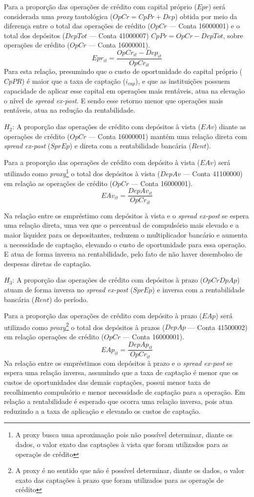 \documentclass[12pt,12pt,openright,oneside,a4paper,chapter=TITLE,section=TITLE,subsection=TITLE,subsubsection=TITLE english,french,spanish,portugues,sumario=tradicional]{abntex2}
\begin{document}
Para a proporção das operações de crédito com capital próprio (\(Epr\)) será considerada uma \emph{proxy} tautológica (\(OpCr = CpPr + Dep\)) obtida por meio da diferença entre o total das operações de crédito (\(OpCr\) --- Conta 16000001) e o total dos depósitos (\(DepTot\) --- Conta 41000007) \(CpPr = OpCr - DepTot\), sobre operações de crédito (\(OpCr\) --- Conta 16000001).
\[
Epr_{it} = \frac{OpCr_{it} - Dep_{it}}{OpCr_{it}}
\]
Para esta relação, presumindo que o custo de oportunidade do capital próprio (\(CpPR\)) é maior que a taxa de captação (\(i_{cap}\)), e que as instituições possuem capacidade de aplicar esse capital em operações mais rentáveis, atua na elevação o nível de \emph{spread ex-post}. E sendo esse retorno menor que operações mais rentáveis, atua na redução da rentabilidade.

\(H_2\): A proporção das operações de crédito com depósitos à vista (\(EAv\)) diante as operações de crédito (\(OpCr\) --- Conta 16000001) mantém uma relação direta com \emph{spread ex-post} (\(SprEp\)) e direta com a rentabilidade bancária (\(Rent\)).

Para a proporção das operações de crédito com depósito à vista (\(EAv\)) será utilizado como \emph{proxy}\footnote{A proxy busca uma aproximação pois não possível determinar, diante os dados, o valor exato das captações à vista que foram utilizados para as operaçõs de crédito} o total dos depósitos à vista (\(DepAv\) --- Conta 41100000) em relação as operações de crédito (\(OpCr\) --- Conta 16000001).
\[
EAv_{it} = \frac{DepAv_{it}}{OpCr_{it}}
\]

Na relação entre os empréstimo com depósitos à vista e o \emph{spread ex-post} se espera uma relação direta, uma vez que o percentual de compulsório mais elevado e a maior liquidez para os depositantes, reduzem o multiplicador bancário e aumenta a necessidade de captação, elevando o custo de oportunidade para essa operação. E atua de forma inversa na rentabilidade, pelo fato de não haver desembolso de despesas diretas de captação.

\(H_3\): A proporção das operações de crédito com depósitos à prazo (\(OpCrDpAp\)) atuam de forma inversa no \emph{spread ex-post} (\(SprEp\)) e inversa com a rentabilidade bancária (\(Rent\)) do período.

Para a proporção das operações de crédito com depósito à prazo (\(EAp\)) será utilizado como \emph{proxy}\footnote{A proxy é no sentido que não é possível determinar, diante os dados, o valor exato das captações à prazo que foram utilizados para as operaçõs de crédito} o total dos depósitos à prazos (\(DepAp\) --- Conta 41500002) em relação operações de crédito (\(OpCr\) --- Conta 16000001).
\[
EAp_{it} = \frac{DepAp_{it}}{OpCr_{it}}
\]
Na relação entre os empréstimos com depósitos à prazo e o \emph{spread ex-post} se espera uma relação inversa, assumindo que a taxa de captação é menor que os custos de oportunidades das demais captações, possui menor taxa de recolhimento compulsório e menor necessidade de captação para a operação. Em relação a rentabilidade é esperado que ocorra uma relação inversa, pois atua reduzindo a a taxa de aplicação e elevando os custos de captação.
\end{document}
